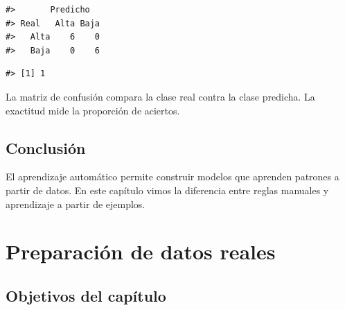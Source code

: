 \documentclass[
  spanish,
  10.5pt,
  letterpaper,
  openany,
  headings=big]{scrbook}
\newenvironment{Shaded}{}{}
\newcommand{\FunctionTok}[1]{\textcolor[rgb]{0.44,0.26,0.76}{#1}}
\newcommand{\NormalTok}[1]{\textcolor[rgb]{0.14,0.16,0.18}{#1}}
\newcommand{\SpecialCharTok}[1]{\textcolor[rgb]{0.00,0.36,0.77}{#1}}
\begin{document}
\begin{verbatim}
#>       Predicho
#> Real   Alta Baja
#>   Alta    6    0
#>   Baja    0    6
\end{verbatim}

\begin{Shaded}
\end{Shaded}

\begin{verbatim}
#> [1] 1
\end{verbatim}

\begin{tcolorbox}[enhanced jigsaw, arc=.35mm, bottomrule=.15mm, bottomtitle=1mm, breakable, colback=white, colbacktitle=quarto-callout-tip-color!10!white, colframe=quarto-callout-tip-color-frame, coltitle=black, left=2mm, leftrule=.75mm, opacityback=0, opacitybacktitle=0.6, rightrule=.15mm, title=\textcolor{quarto-callout-tip-color}{\faLightbulb}\hspace{0.5em}{Interpretación del resultado}, titlerule=0mm, toprule=.15mm, toptitle=1mm]

La matriz de confusión compara la clase real contra la clase predicha.
La exactitud mide la proporción de aciertos.

\end{tcolorbox}

\section{Conclusión}\label{conclusiuxf3n}

El aprendizaje automático permite construir modelos que aprenden
patrones a partir de datos. En este capítulo vimos la diferencia entre
reglas manuales y aprendizaje a partir de ejemplos.


\chapter{Preparación de datos
reales}\label{preparaciuxf3n-de-datos-reales}

\section{Objetivos del capítulo}\label{objetivos-del-capuxedtulo-1}
\end{document}
